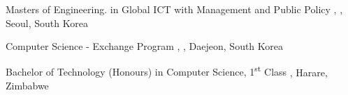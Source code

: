 

	{Masters of Engineering. in Global ICT with Management and Public Policy}
	{\ssu , , Seoul, South Korea}

	{Computer Science - Exchange Program}
	{\dju , , Daejeon, South Korea}

	{Bachelor of Technology (Honours) in Computer Science, 1\textsuperscript{st} Class}
    {\hit, Harare, Zimbabwe}


\pagebreak